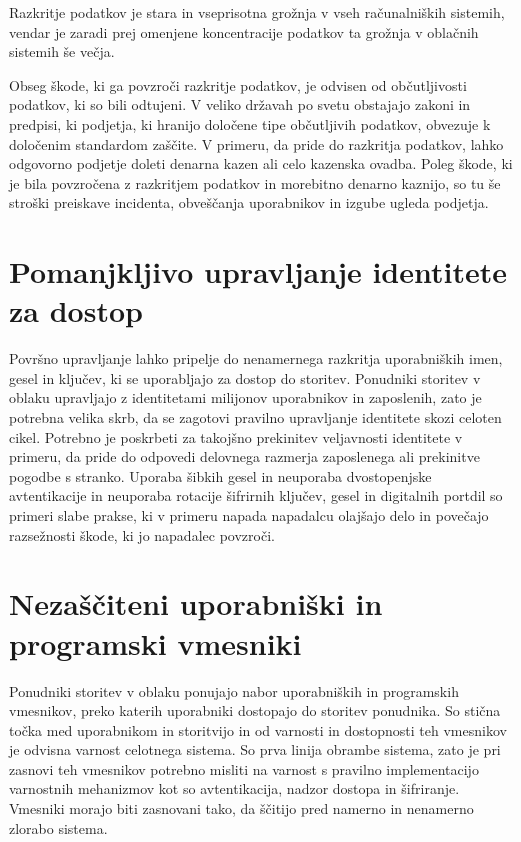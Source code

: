 \documentclass[12pt,a4paper,openany,tikz]{book}
\theoremstyle{plain}
\theoremstyle{definition}
\begin{document}
Razkritje podatkov je stara in vseprisotna grožnja v vseh računalniških sistemih, vendar je zaradi prej omenjene koncentracije podatkov ta grožnja v oblačnih sistemih še večja.

Obseg škode, ki ga povzroči razkritje podatkov, je odvisen od občutljivosti podatkov, ki so bili odtujeni. V veliko državah po svetu obstajajo zakoni in predpisi, ki podjetja, ki hranijo določene tipe občutljivih podatkov, obvezuje k določenim standardom zaščite. V primeru, da pride do razkritja podatkov, lahko odgovorno podjetje doleti denarna kazen ali celo kazenska ovadba. Poleg škode, ki je bila povzročena z razkritjem podatkov in morebitno denarno kaznijo, so tu še stroški preiskave incidenta, obveščanja uporabnikov in izgube ugleda podjetja.

\section{Pomanjkljivo upravljanje identitete za dostop}
\label{sub:Pomanjkljivo upravljanje identitete za dostop}

Površno upravljanje lahko pripelje do nenamernega razkritja uporabniških imen, gesel in ključev, ki se uporabljajo za dostop do storitev. Ponudniki storitev v oblaku upravljajo z identitetami milijonov uporabnikov in zaposlenih, zato je potrebna velika skrb, da se zagotovi pravilno upravljanje identitete skozi celoten cikel. Potrebno je poskrbeti za takojšno prekinitev veljavnosti identitete v primeru, da pride do odpovedi delovnega razmerja zaposlenega ali prekinitve pogodbe s stranko. Uporaba šibkih gesel in neuporaba dvostopenjske avtentikacije in neuporaba rotacije šifrirnih ključev, gesel in digitalnih portdil so primeri slabe prakse, ki v primeru napada napadalcu olajšajo delo in povečajo razsežnosti škode, ki jo napadalec povzroči.

\section{Nezaščiteni uporabniški in programski vmesniki}
\label{sub:Nezaščiteni uporabniški in programski vmesniki}

Ponudniki storitev v oblaku ponujajo nabor uporabniških in programskih vmesnikov, preko katerih uporabniki dostopajo do storitev ponudnika. So stična točka med uporabnikom in storitvijo in od varnosti in dostopnosti teh vmesnikov je odvisna varnost celotnega sistema. So prva linija obrambe sistema, zato je pri zasnovi teh vmesnikov potrebno misliti na varnost s pravilno implementacijo varnostnih mehanizmov kot so avtentikacija, nadzor dostopa in šifriranje. Vmesniki morajo biti zasnovani tako, da ščitijo pred namerno in nenamerno zlorabo sistema.
\end{document}
